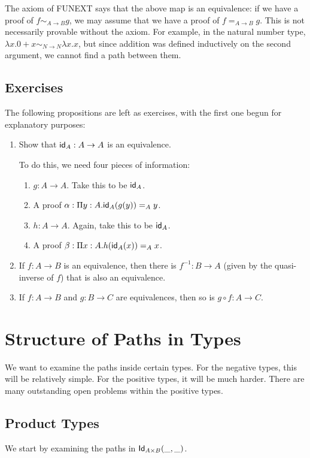 \documentclass[12pt]{article}
\newcommand*{\comp}{\mathbin{\circ}}
\begin{document}
The axiom of FUNEXT says that the above map is an equivalence: if we have a proof
of $f \sim_{A\to B} g$, we may assume that we have a proof of $f =_{A\to B} g$. This is not
necessarily provable without the axiom. For example, in the natural number type,
$\lambda x.0+x \sim_{N\to N} \lambda x.x$, but since addition was defined inductively on the
second argument, we cannot find a path between them.

\subsection{Exercises}
The following propositions are left as exercises, with the first one begun for explanatory
purposes:

\begin{enumerate}
 \item Show that $\textsf{id}_A: A\to A$ is an equivalence.
 
 To do this, we need four pieces of information:
 \begin{enumerate}
  \item $g: A\to A$. Take this to be $\textsf{id}_A$.
  \item A proof $\alpha: \Pi y:A. \textsf{id}_A(g (y)) =_A y$.
  \item $h: A\to A$. Again, take this to be $\textsf{id}_A$.
  \item A proof $\beta: \Pi x:A. h(\textsf{id}_A(x)) =_A x$.
 \end{enumerate}

 \item If $f: A\to B$ is an equivalence, then there is $f^{-1}: B\to A$ (given by 
 the quasi-inverse of $f$) that is also an equivalence.
 
 \item If $f: A\to B$ and $g: B\to C$ are equivalences, then so is $g\comp f: A\to C$.
\end{enumerate}



\section{Structure of Paths in Types}

We want to examine the paths inside certain types. For the negative types, this will be
relatively simple. For the positive types, it will be much harder. There are many outstanding
open problems within the positive types.

\subsection{Product Types}
We start by examining the paths in $\mathsf{Id}_{A\times B}(\_,\_)$. 
\end{document}
